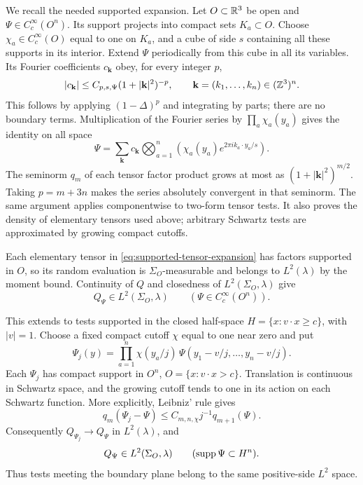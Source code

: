 We recall the needed supported expansion. Let $O\subset\mathbb R^3$ be open
and $\Psi\in C_c^\infty(O^n)$. Its support projects into compact
sets $K_a\subset O$. Choose $\chi_a\in C_c^\infty(O)$ equal to one
on $K_a$, and a cube of side $s$ containing all these supports in
its interior. Extend $\Psi$ periodically from this cube in all its
variables. Its Fourier coefficients $c_{\mathbf k}$ obey, for
every integer $p$,
\[
 |c_{\mathbf k}|\le C_{p,s,\Psi}(1+|\mathbf k|^2)^{-p},
 \qquad \mathbf k=(k_1,\ldots,k_n)\in(\mathbb Z^3)^n.
\]
This follows by applying $(1-\Delta)^p$ and integrating by parts;
there are no boundary terms. Multiplication of the Fourier series by
$\prod_a\chi_a(y_a)$ gives the identity on all space
\begin{equation}\label{eq:supported-tensor-expansion}
 \Psi=\sum_{\mathbf k}c_{\mathbf k}
       \bigotimes_{a=1}^n
       \left(\chi_a(y_a)e^{2\pi i k_a\cdot y_a/s}\right).
\end{equation}
The seminorm $q_m$ of each tensor factor product grows at most as
$(1+|\mathbf k|^2)^{m/2}$. Taking $p=m+3n$ makes the series
absolutely convergent in that seminorm. The same argument applies
componentwise to two-form tensor tests. It also proves the density
of elementary tensors used above; arbitrary Schwartz tests are
approximated by growing compact cutoffs.

Each elementary tensor in \eqref{eq:supported-tensor-expansion}
has factors supported in $O$, so its random evaluation is
$\Sigma_O$-measurable and belongs to $L^2(\lambda)$ by the moment
bound. Continuity of $Q$ and closedness of $L^2(\Sigma_O,\lambda)$
give
\begin{equation}\label{eq:tensor-local-measurability}
 Q_\Psi\in L^2(\Sigma_O,\lambda)
       \qquad(\Psi\in C_c^\infty(O^n)).
\end{equation}

This extends to tests supported in the closed half-space
$H=\{x:v\cdot x\ge c\}$, with $|v|=1$. Choose a fixed compact
cutoff $\chi$ equal to one near zero and put
\[
 \Psi_j(y)=\prod_{a=1}^n\chi(y_a/j)\,
           \Psi(y_1-v/j,\ldots,y_n-v/j).
\]
Each $\Psi_j$ has compact support in
$O^n$, $O=\{x:v\cdot x>c\}$. Translation is continuous in Schwartz
space, and the growing cutoff tends to one in its action on each
Schwartz function. More explicitly, Leibniz' rule gives
\[
 q_m(\Psi_j-\Psi)\le C_{m,n,\chi}j^{-1}q_{m+1}(\Psi).
\]
Consequently $Q_{\Psi_j}\to Q_\Psi$ in $L^2(\lambda)$, and
\begin{equation}\label{eq:tensor-closed-halfspace}
 Q_\Psi\in L^2(\Sigma_O,\lambda)\qquad
                   (\operatorname{supp}\Psi\subset H^n).
\end{equation}
Thus tests meeting the boundary plane belong to the same
positive-side $L^2$ space.

